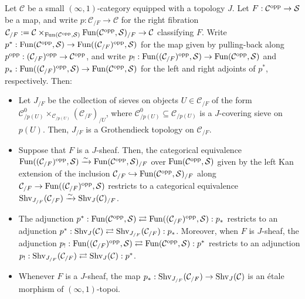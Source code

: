 \documentclass[10pt]{article}
\newcommand{\mS}{\mathcal S}
\newcommand{\C}{\mathcal C}
\theoremstyle{witharg}
\theoremstyle{witharg}
\theoremstyle{witharg2}
\begin{document}
\begin{proposition}{}\label{Etale Slices of Sheaf Topoi}

    Let $\C$ be a small $(\infty,1)$-category equipped with a topology $J$. Let $F:\C^{\textnormal{opp}}\rightarrow \mS$ be a map, and write $p:\C_{/F}\rightarrow \C$ for the right fibration $\C_{/F}:=\C\times_{\textnormal{Fun}(\C^{\textnormal{opp}},\mS)}\textnormal{Fun}(\C^{\textnormal{opp}},\mS)_{/F}\rightarrow \C$ classifying $F$. Write $p^*:\textnormal{Fun}(\C^{\textnormal{opp}},\mS)\rightarrow \textnormal{Fun}((\C_{/F})^{\textnormal{opp}},\mS)$ for the map given by pulling-back along $p^{\textnormal{opp}}:(\C_{/F})^{\textnormal{opp}}\rightarrow \C^{\textnormal{opp}}$, and write $p_!:\textnormal{Fun}((\C_{/F})^{\textnormal{opp}},\mS)\rightarrow \textnormal{Fun}(\C^{\textnormal{opp}},\mS)$ and $p_*:\textnormal{Fun}((\C_{/F})^{\textnormal{opp}},\mS)\rightarrow \textnormal{Fun}(\C^{\textnormal{opp}},\mS)$ for the left and right adjoints of $p^*$, respectively. Then:

    \begin{itemize}

        \item [$(1)$] Let $J_{/F}$ be the collection of sieves on objects $U\in \C_{/F}$ of the form $\C^{0}_{/p(U)}\times_{\C_{/p(U)}}(\C_{/F})_{/U}$, where $\C^{0}_{/p(U)}\subseteq \C_{/p(U)}$ is a $J$-covering sieve on $p(U)$. Then, $J_{/F}$ is a Grothendieck topology on $\C_{/F}$.


        \item [$(2)$] Suppose that $F$ is a $J$-sheaf. Then, the categorical equivalence $\textnormal{Fun}((\C_{/F})^{\textnormal{opp}},\mS)\xrightarrow{\sim}\textnormal{Fun}(\C^{\textnormal{opp}},\mS)_{/F}$ over $\textnormal{Fun}(\C^{\textnormal{opp}},\mS)$ given by the left Kan extension of the inclusion $\C_{/F}\hookrightarrow \textnormal{Fun}(\C^{\textnormal{opp}},\mS)_{/F}$ along $\C_{/F}\rightarrow \textnormal{Fun}((\C_{/F})^{\textnormal{opp}},\mS)$ restricts to a categorical equivalence $\textnormal{Shv}_{J_{/F}}(\C_{/F})\xrightarrow{\sim}\textnormal{Shv}_{J}(\C)_{/F}$.

        \item [$(3)$] The adjunction $p^*:\textnormal{Fun}(\C^{\textnormal{opp}},\mS)\rightleftarrows \textnormal{Fun}((\C_{/F})^{\textnormal{opp}},\mS):p_*$ restricts to an adjunction $p^*:\textnormal{Shv}_{J}(\C)\rightleftarrows \textnormal{Shv}_{J_{/F}}(\C_{/F}):p_*$. Moreover, when $F$ is $J$-sheaf, the adjunction $p_!:\textnormal{Fun}((\C_{/F})^{\textnormal{opp}},\mS)\rightleftarrows\textnormal{Fun}(\C^{\textnormal{opp}},\mS):p^*$ restricts to an adjunction $p_!:\textnormal{Shv}_{J_{/F}}(\C_{/F})\rightleftarrows \textnormal{Shv}_{J}(\C):p^*$. 

        \item [$(4)$] Whenever $F$ is a $J$-sheaf, the map $p_*:\textnormal{Shv}_{J_{/F}}(\C_{/F})\rightarrow \textnormal{Shv}_{J}(\C)$ is an \'{e}tale morphism of $(\infty,1)$-topoi. 
      

    \end{itemize}

\end{proposition}
\end{document}
